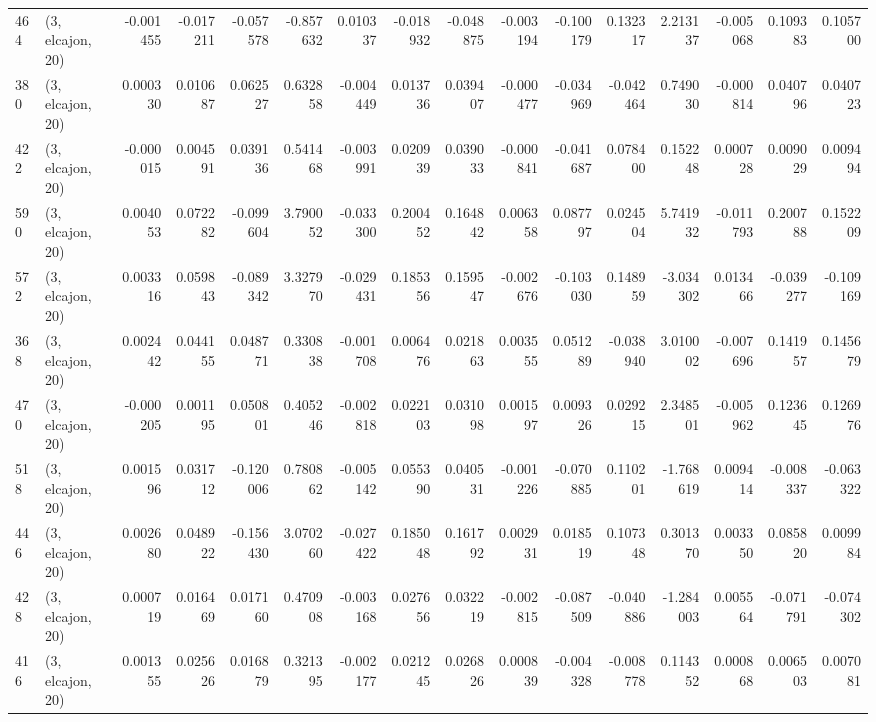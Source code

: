 \begin{tabular}{llrrrrrrrrrrrrrr}
464 &  (3, elcajon, 20) &  -0.001455 & -0.017211 & -0.057578 &   -0.857632 &  0.010337 &  -0.018932 & -0.048875 & -0.003194 & -0.100179 &  0.132317 &    2.213137 & -0.005068 &  0.109383 &  0.105700 \\
380 &  (3, elcajon, 20) &   0.000330 &  0.010687 &  0.062527 &    0.632858 & -0.004449 &   0.013736 &  0.039407 & -0.000477 & -0.034969 & -0.042464 &    0.749030 & -0.000814 &  0.040796 &  0.040723 \\
422 &  (3, elcajon, 20) &  -0.000015 &  0.004591 &  0.039136 &    0.541468 & -0.003991 &   0.020939 &  0.039033 & -0.000841 & -0.041687 &  0.078400 &    0.152248 &  0.000728 &  0.009029 &  0.009494 \\
590 &  (3, elcajon, 20) &   0.004053 &  0.072282 & -0.099604 &    3.790052 & -0.033300 &   0.200452 &  0.164842 &  0.006358 &  0.087797 &  0.024504 &    5.741932 & -0.011793 &  0.200788 &  0.152209 \\
572 &  (3, elcajon, 20) &   0.003316 &  0.059843 & -0.089342 &    3.327970 & -0.029431 &   0.185356 &  0.159547 & -0.002676 & -0.103030 &  0.148959 &   -3.034302 &  0.013466 & -0.039277 & -0.109169 \\
368 &  (3, elcajon, 20) &   0.002442 &  0.044155 &  0.048771 &    0.330838 & -0.001708 &   0.006476 &  0.021863 &  0.003555 &  0.051289 & -0.038940 &    3.010002 & -0.007696 &  0.141957 &  0.145679 \\
470 &  (3, elcajon, 20) &  -0.000205 &  0.001195 &  0.050801 &    0.405246 & -0.002818 &   0.022103 &  0.031098 &  0.001597 &  0.009326 &  0.029215 &    2.348501 & -0.005962 &  0.123645 &  0.126976 \\
518 &  (3, elcajon, 20) &   0.001596 &  0.031712 & -0.120006 &    0.780862 & -0.005142 &   0.055390 &  0.040531 & -0.001226 & -0.070885 &  0.110201 &   -1.768619 &  0.009414 & -0.008337 & -0.063322 \\
446 &  (3, elcajon, 20) &   0.002680 &  0.048922 & -0.156430 &    3.070260 & -0.027422 &   0.185048 &  0.161792 &  0.002931 &  0.018519 &  0.107348 &    0.301370 &  0.003350 &  0.085820 &  0.009984 \\
428 &  (3, elcajon, 20) &   0.000719 &  0.016469 &  0.017160 &    0.470908 & -0.003168 &   0.027656 &  0.032219 & -0.002815 & -0.087509 & -0.040886 &   -1.284003 &  0.005564 & -0.071791 & -0.074302 \\
416 &  (3, elcajon, 20) &   0.001355 &  0.025626 &  0.016879 &    0.321395 & -0.002177 &   0.021245 &  0.026826 &  0.000839 & -0.004328 & -0.008778 &    0.114352 &  0.000868 &  0.006503 &  0.007081 \\

\end{tabular}
